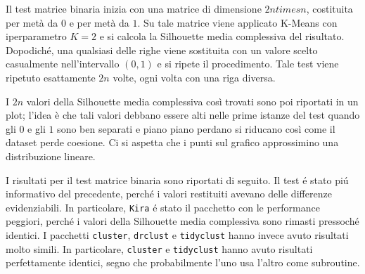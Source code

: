 \documentclass[italian]{article}
\begin{document}
			Il test matrice binaria inizia con una matrice di dimensione
			$2n times n$, costituita per metà da $0$ e per metà da $1$.
			Su tale matrice viene applicato K-Means con iperparametro
			$K = 2$ e si calcola la Silhouette media complessiva del
			risultato. Dopodiché, una qualsiasi delle righe viene sostituita
			con un valore scelto casualmente nell'intervallo $(0, 1)$ e si
			ripete il procedimento. Tale test viene ripetuto esattamente
			$2n$ volte, ogni volta con una riga diversa.

			I $2n$ valori della Silhouette media complessiva così trovati
			sono poi riportati in un plot; l'idea è che tali valori debbano
			essere alti nelle prime istanze del test quando gli $0$ e gli
			$1$ sono ben separati e piano piano perdano si riducano così
			come il dataset perde coesione. Ci si aspetta che i punti sul
			grafico approssimino una distribuzione lineare.

			I risultati per il test matrice binaria sono riportati
			di seguito. Il test é stato piú informativo del precedente,
			perché i valori restituiti avevano delle differenze
			evidenziabili. In particolare, \texttt{Kira} é stato il
			pacchetto con le performance peggiori, perché i valori
			della Silhouette media complessiva sono rimasti pressoché
			identici. I pacchetti \texttt{cluster}, \texttt{drclust}
			e \texttt{tidyclust} hanno invece avuto risultati molto
			simili. In particolare, \texttt{cluster} e \texttt{tidyclust}
			hanno avuto risultati perfettamente identici, segno che
			probabilmente l'uno usa l'altro come subroutine.
\end{document}
